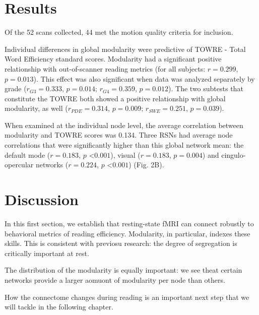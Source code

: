 \section{Results} 

Of the 52 scans collected, 44 met the motion quality criteria for inclusion. 

Individual differences in global modularity were predictive of TOWRE - Total Word Efficiency standard scores. Modularity had a significant positive relationship with out-of-scanner reading metrics (for all subjects: $r = 0.299$, $p = 0.013$). This effect was also significant when data was analyzed separately by grade ($r_{G3} = 0.333$, $p = 0.014$; $r_{G4} = 0.359$, $p = 0.012$). The two subtests that constitute the TOWRE both showed a positive relationship with global modularity, as well ($r_{PDE} = 0.314$, $p = 0.009$; $r_{SWE} = 0.251$, $p = 0.039$). 

When examined at the individual node level, the average correlation between modularity and TOWRE scores was 0.134. Three RSNs had average node correlations that were significantly higher than this global network mean: the default mode ($r = 0.183$, $p$ \textless $0.001$), visual ($r = 0.183$, $p = 0.004$) and cingulo-opercular networks ($r = 0.224$, $p$ \textless $0.001$) (Fig. 2B). 

\section{Discussion}

In this first section, we establish that resting-state fMRI can connect robustly to behavioral metrics of reading efficiency. Modularity, in particular, indexes these skills. This is consistent with previosu research: the degree of segregation is critically important at rest. 

The distribution of the modularity is equally important: we see theat certain networks provide a larger aomuont of modularity per node than others. 

How the connectome changes during reading is an important next step that we will tackle in the following chapter.